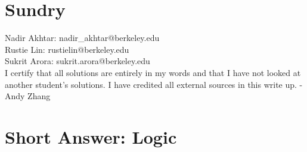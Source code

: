 \documentclass[11pt]{article}
\newcommand*{\Question}[1]{\vfill\pagebreak[3]\section{#1}}
\newenvironment{Answer}{\vspace{20pt}}{\vspace{20pt}}
\begin{document}
\section{Sundry} 
\begin{Answer}
Nadir Akhtar: nadir\_akhtar@berkeley.edu\\
Rustie Lin: rustielin@berkeley.edu\\
Sukrit Arora: sukrit.arora@berkeley.edu\\

I certify that all solutions are entirely in my words and that I have not looked at another student’s
solutions. I have credited all external sources in this write up. - Andy Zhang

\end{Answer}


\Question{Short Answer: Logic}
\end{document}
